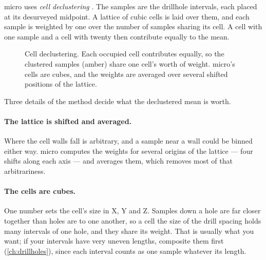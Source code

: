 micro uses \emph{cell declustering} \parencite{journel1983,deutsch1989,deutsch1998}. The samples are the drillhole intervals, each placed at its desurveyed midpoint. A lattice of cubic cells is laid over them, and each sample is weighted by one over the number of samples sharing its cell. A cell with one sample and a cell with twenty then contribute equally to the mean.

\begin{figure}[htbp]\centering
{}
\caption{Cell declustering. Each occupied cell contributes equally, so the clustered samples (amber) share one cell's worth of weight. micro's cells are cubes, and the weights are averaged over several shifted positions of the lattice.}\label{fig:validation-cells}
\end{figure}

Three details of the method decide what the declustered mean is worth.

\paragraph{The lattice is shifted and averaged.} Where the cell walls fall is arbitrary, and a sample near a wall could be binned either way. micro computes the weights for several origins of the lattice — four shifts along each axis — and averages them, which removes most of that arbitrariness.

\paragraph{The cells are cubes.} One number sets the cell's size in X, Y and Z. Samples down a hole are far closer together than holes are to one another, so a cell the size of the drill spacing holds many intervals of one hole, and they share its weight. That is usually what you want; if your intervals have very uneven lengths, composite them first (\cref{ch:drillholes}), since each interval counts as one sample whatever its length.

